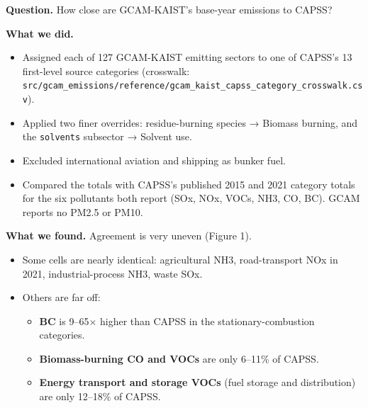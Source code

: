 \textbf{Question.}
How close
are
GCAM-KAIST's
base-year
emissions
to CAPSS?

\textbf{What
we did.}

\begin{itemize}
\tightlist
\item
  Assigned
  each of
  127
  GCAM-KAIST
  emitting
  sectors
  to one
  of
  CAPSS's
  13
  first-level
  source
  categories
  (crosswalk:
  \texttt{src/\allowbreak{}gcam\_\allowbreak{}emissions/\allowbreak{}reference/\allowbreak{}gcam\_\allowbreak{}kaist\_\allowbreak{}capss\_\allowbreak{}category\_\allowbreak{}crosswalk.\allowbreak{}csv}).
\item
  Applied
  two
  finer
  overrides:
  residue-burning
  species
  →
  Biomass
  burning,
  and the
  \texttt{solvents}
  subsector
  →
  Solvent
  use.
\item
  Excluded
  international
  aviation
  and
  shipping
  as
  bunker
  fuel.
\item
  Compared
  the
  totals
  with
  CAPSS's
  published
  2015 and
  2021
  category
  totals
  for the
  six
  pollutants
  both
  report
  (SOx,
  NOx,
  VOCs,
  NH3, CO,
  BC).
  GCAM
  reports
  no PM2.5
  or PM10.
\end{itemize}

\textbf{What
we found.}
Agreement
is very
uneven
(Figure
1).

\begin{itemize}
\tightlist
\item
  Some
  cells
  are
  nearly
  identical:
  agricultural
  NH3,
  road-transport
  NOx in
  2021,
  industrial-process
  NH3,
  waste
  SOx.
\item
  Others
  are far
  off:

  \begin{itemize}
  \tightlist
  \item
    \textbf{BC}
    is
    9--65×
    higher
    than
    CAPSS
    in the
    stationary-combustion
    categories.
  \item
    \textbf{Biomass-burning
    CO and
    VOCs}
    are
    only
    6--11\%
    of
    CAPSS.
  \item
    \textbf{Energy
    transport
    and
    storage
    VOCs}
    (fuel
    storage
    and
    distribution)
    are
    only
    12--18\%
    of
    CAPSS.
  \end{itemize}
\end{itemize}


